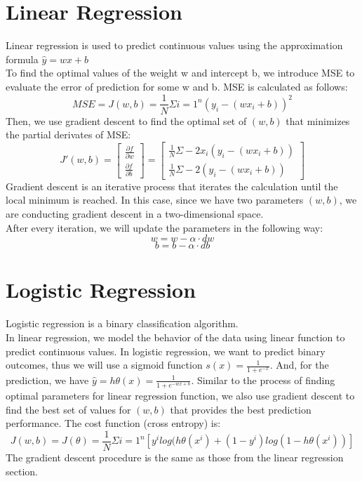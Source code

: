 \documentclass[12pt]{article}
\begin{document}
\section{Linear Regression}
Linear regression is used to predict continuous values using the approximation formula $\hat{y} = wx + b$\\
To find the optimal values of the weight w and intercept b, we introduce MSE to evaluate the error of prediction for some w and b. MSE is calculated as follows:
$$MSE = J(w, b) = \frac{1}{N}\Sigma  {i=1}^n(y_i - (wx_i + b))^2$$
Then, we use gradient descent to find the optimal set of $(w, b)$ that minimizes the partial derivates of MSE:
$$J'(w, b) = \begin{bmatrix} \frac{\partial f}{\partial w} \\ \frac{\partial f}{\partial b} \end{bmatrix} = \begin{bmatrix} \frac{1}{N}\Sigma -2x_i(y_i - (wx_i + b))\\ \frac{1}{N}\Sigma -2(y_i - (wx_i + b))\end{bmatrix}
$$
Gradient descent is an iterative process that iterates the calculation until the local minimum is reached. In this case, since we have two parameters $(w, b)$, we are conducting gradient descent in a two-dimensional space.\\
After every iteration, we will update the parameters in the following way:
$$w = w - \alpha \cdot dw$$
$$b = b - \alpha \cdot db$$
\newpage

\section{Logistic Regression}
Logistic regression is a binary classification algorithm.\\
In linear regression, we model the behavior of the data using linear function to predict continuous values. In logistic regression, we want to predict binary outcomes, thus we will use a sigmoid function $s(x) = \frac{1}{1 + e^{-x}}$. And, for the prediction, we have $\hat{y} = h  {\theta}(x) = \frac{1}{1 + e^{-wx+b}}$. Similar to the process of finding optimal parameters for linear regression function, we also use gradient descent to find the best set of values for $(w, b)$ that provides the best prediction performance. The cost function (cross entropy) is:
$$J(w, b) = J(\theta) = \frac{1}{N}\Sigma  {i=1}^n[y^ilog(h  {\theta}(x^i) + (1-y^i)log(1 - h  {\theta}(x^i))]$$
The gradient descent procedure is the same as those from the linear regression section.
\newpage
\end{document}
